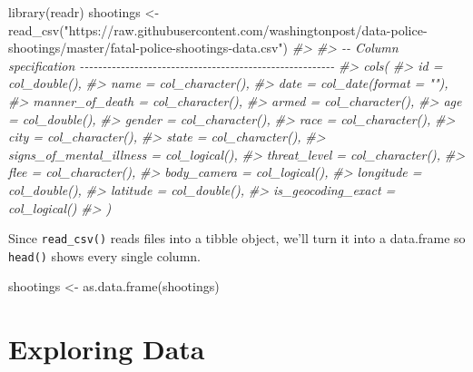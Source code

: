 \documentclass[
  12pt,
]{book}
\newenvironment{Shaded}{\begin{snugshade}}{\end{snugshade}}
\newcommand{\CommentTok}[1]{\textcolor[rgb]{0.37,0.37,0.37}{\textit{#1}}}
\newcommand{\FunctionTok}[1]{\textcolor[rgb]{0,0,0}{#1}}
\newcommand{\NormalTok}[1]{#1}
\newcommand{\OtherTok}[1]{\textcolor[rgb]{0.37,0.37,0.37}{#1}}
\newcommand{\StringTok}[1]{\textcolor[rgb]{0.5,0.5,0.5}{#1}}
\begin{document}
\begin{Shaded}
\begin{Highlighting}[]
\FunctionTok{library}\NormalTok{(readr)}
\NormalTok{shootings }\OtherTok{\textless{}{-}} \FunctionTok{read\_csv}\NormalTok{(}\StringTok{"https://raw.githubusercontent.com/washingtonpost/data{-}police{-}shootings/master/fatal{-}police{-}shootings{-}data.csv"}\NormalTok{)}
\CommentTok{\#\textgreater{} }
\CommentTok{\#\textgreater{} {-}{-} Column specification {-}{-}{-}{-}{-}{-}{-}{-}{-}{-}{-}{-}{-}{-}{-}{-}{-}{-}{-}{-}{-}{-}{-}{-}{-}{-}{-}{-}{-}{-}{-}{-}{-}{-}{-}{-}{-}{-}{-}{-}{-}{-}{-}{-}{-}{-}{-}{-}{-}{-}{-}{-}{-}{-}{-}{-}}
\CommentTok{\#\textgreater{} cols(}
\CommentTok{\#\textgreater{}   id = col\_double(),}
\CommentTok{\#\textgreater{}   name = col\_character(),}
\CommentTok{\#\textgreater{}   date = col\_date(format = ""),}
\CommentTok{\#\textgreater{}   manner\_of\_death = col\_character(),}
\CommentTok{\#\textgreater{}   armed = col\_character(),}
\CommentTok{\#\textgreater{}   age = col\_double(),}
\CommentTok{\#\textgreater{}   gender = col\_character(),}
\CommentTok{\#\textgreater{}   race = col\_character(),}
\CommentTok{\#\textgreater{}   city = col\_character(),}
\CommentTok{\#\textgreater{}   state = col\_character(),}
\CommentTok{\#\textgreater{}   signs\_of\_mental\_illness = col\_logical(),}
\CommentTok{\#\textgreater{}   threat\_level = col\_character(),}
\CommentTok{\#\textgreater{}   flee = col\_character(),}
\CommentTok{\#\textgreater{}   body\_camera = col\_logical(),}
\CommentTok{\#\textgreater{}   longitude = col\_double(),}
\CommentTok{\#\textgreater{}   latitude = col\_double(),}
\CommentTok{\#\textgreater{}   is\_geocoding\_exact = col\_logical()}
\CommentTok{\#\textgreater{} )}
\end{Highlighting}
\end{Shaded}

Since \texttt{read\_csv()} reads files into a tibble object, we'll turn it into a data.frame so \texttt{head()} shows every single column.

\begin{Shaded}
\begin{Highlighting}[]
\NormalTok{shootings }\OtherTok{\textless{}{-}} \FunctionTok{as.data.frame}\NormalTok{(shootings)}
\end{Highlighting}
\end{Shaded}

\hypertarget{exploring-data}{%
\section{Exploring Data}\label{exploring-data}}
\end{document}
